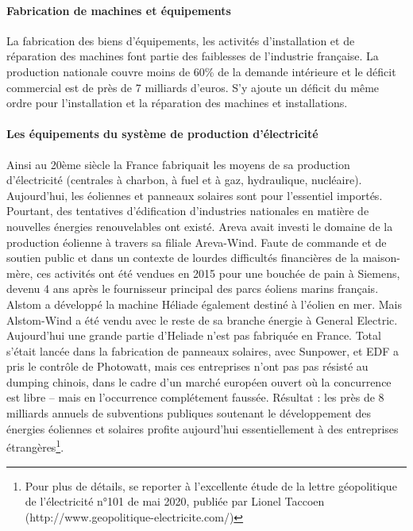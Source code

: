 \documentclass[a4paper]{article}
\begin{document}
\paragraph{Fabrication de machines et équipements}
La fabrication des biens d’équipements, les activités d’installation et de réparation des machines font partie des faiblesses de l’industrie française. La production nationale couvre moins de 60\% de la demande intérieure et le déficit commercial est de près de 7 milliards d'euros. S’y ajoute un déficit du même ordre pour l’installation et la réparation des machines et installations. 

\paragraph{Les équipements du système de production d’électricité}
Ainsi au 20ème siècle la France fabriquait les moyens de sa production d’électricité (centrales à charbon, à fuel et à gaz, hydraulique, nucléaire). Aujourd’hui, les éoliennes et panneaux solaires sont pour l’essentiel importés. Pourtant, des tentatives d’édification d’industries nationales en matière de nouvelles énergies renouvelables ont existé. Areva avait investi le domaine de la production éolienne à travers sa filiale Areva-Wind. Faute de commande et de soutien public et dans un contexte de lourdes difficultés financières de la maison-mère, ces activités ont été vendues en 2015 pour une bouchée de pain à Siemens, devenu 4 ans après le fournisseur principal des parcs éoliens marins français.  Alstom a développé la machine Héliade également destiné à l’éolien en mer. Mais Alstom-Wind a été vendu avec le reste de sa branche énergie à General Electric. Aujourd’hui une grande partie d’Heliade n’est pas fabriquée en France. Total s’était lancée dans la fabrication de panneaux solaires, avec Sunpower, et EDF a pris le contrôle de Photowatt,  mais ces entreprises n’ont pas pas résisté au dumping chinois, dans le cadre d’un marché européen ouvert où la concurrence est libre – mais en l’occurrence complétement faussée. Résultat : les près de 8 milliards annuels de subventions publiques soutenant le développement des énergies éoliennes et solaires profite aujourd’hui essentiellement à des entreprises étrangères\footnote{Pour plus de détails, se reporter à l’excellente étude de la lettre géopolitique de l’électricité n°101 de mai 2020, publiée par Lionel Taccoen (http://www.geopolitique-electricite.com/)}. 
\end{document}
